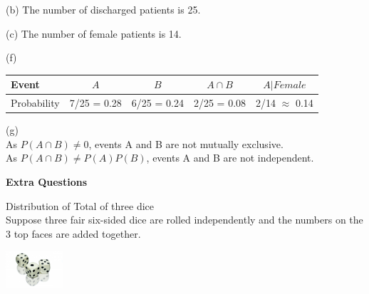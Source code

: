 \documentclass[bigtut]{tutorial}\usepackage[]{graphicx}\usepackage[]{color}
\begin{document}
\begin{tutorial}
\begin{questions}
\begin{solution}
\vspace{.5cm}
(b) 
The number of discharged patients is 25.

\vspace{.5cm}
(c) 
The number of female patients is 14.

\vspace{.5cm}
(f) \\
\begin{tabular}{|l|c|c|c|c|} \hline
Event & $A$ \hspace{1cm} & $B$ \hspace{1cm} & $A \cap B$ \hspace{1cm} & $A | Female$ \hspace{1cm} \\ \hline
Probability & 7/25 = 0.28 & 6/25 = 0.24  & 2/25 = 0.08 & 2/14 $\approx$ 0.14 \\ \hline
\end{tabular}

\vspace{.5cm}
(g) \\
As $P( A \cap B) \neq 0$, events A and B are not mutually exclusive. \\
As $P(A \cap B) \neq P(A)P(B)$, events A and B are not independent.
\end{solution}




\newpage
\hspace{-1cm} {\bf Extra Questions}


\vspace{.5cm}
\question Distribution of Total of three dice  \\

Suppose three fair six-sided dice are rolled independently and the numbers on the 3 top faces are added together. 

\includegraphics[height=1.4cm]{3Dice.jpg}

\end{questions}
\end{tutorial}
\end{document}
